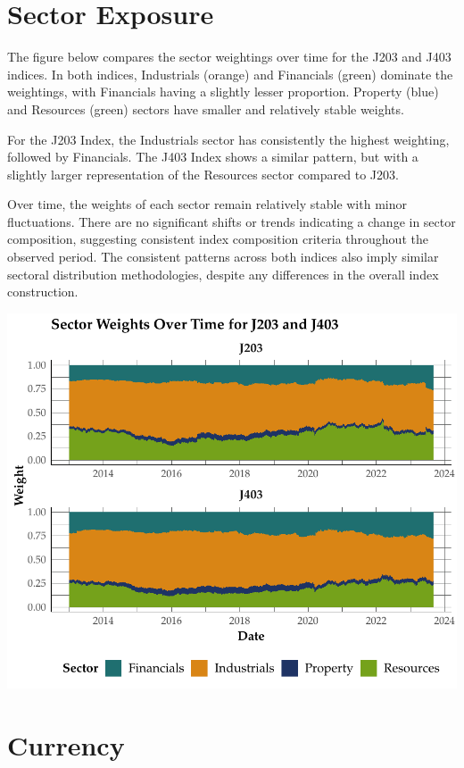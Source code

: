 \documentclass[11pt,preprint, authoryear]{elsarticle}
\numberwithin{equation}{section}
\numberwithin{figure}{section}
\numberwithin{table}{section}
\begin{document}
\hypertarget{sector-exposure}{%
\section{Sector Exposure}\label{sector-exposure}}

The figure below compares the sector weightings over time for the J203
and J403 indices. In both indices, Industrials (orange) and Financials
(green) dominate the weightings, with Financials having a slightly
lesser proportion. Property (blue) and Resources (green) sectors have
smaller and relatively stable weights.

For the J203 Index, the Industrials sector has consistently the highest
weighting, followed by Financials. The J403 Index shows a similar
pattern, but with a slightly larger representation of the Resources
sector compared to J203.

Over time, the weights of each sector remain relatively stable with
minor fluctuations. There are no significant shifts or trends indicating
a change in sector composition, suggesting consistent index composition
criteria throughout the observed period. The consistent patterns across
both indices also imply similar sectoral distribution methodologies,
despite any differences in the overall index construction.

\includegraphics{Question-3_files/figure-latex/unnamed-chunk-1-1.pdf}

\hypertarget{currency}{%
\section{Currency}\label{currency}}
\end{document}
